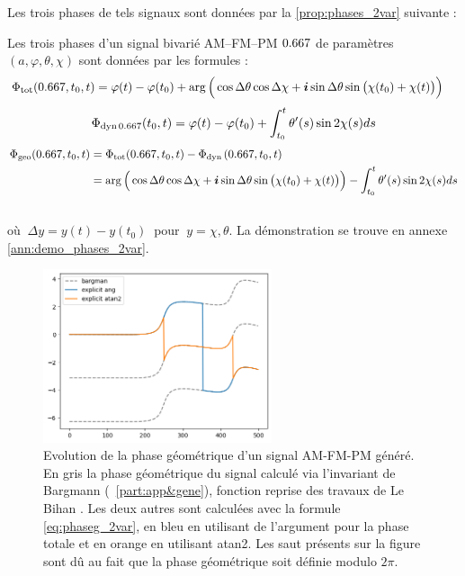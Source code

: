 Les trois phases de tels signaux sont données par la \cref{prop:phases_2var} suivante :
\begin{proposition}\label{prop:phases_2var}
	Les trois phases d'un signal bivarié AM--FM--PM $\x$ 	de paramètres $(a,\varphi,\theta,\chi)$ sont données par les formules :
	\begin{equation}\label{eq:phaset_2var}
		\begin{aligned}
			\phaset(\x,t_0,t) &= \varphi(t)-\varphi(t_0) + \arg\Big(\cos\Delta\theta \cos\Delta\chi + \i\sin\Delta\theta \sin\big(\chi(t_0)+\chi(t)\big)\Big)
		\end{aligned}
	\end{equation}
	\begin{equation}\label{eq:phased_2var}
		\phased[\x](t_0,t) = \varphi(t) -\varphi(t_0) + \int_{t_0}^t\theta'(s) \sin2\chi(s) ds
	\end{equation}
	\begin{equation}\label{eq:phaseg_2var}
		\begin{aligned}
			\phaseg(\x,t_0,t) &= \phaset(\x,t_0,t) - \phased(\x,t_0,t) \\
			&= \arg\Big(\cos\Delta\theta \cos\Delta\chi + \i\sin\Delta\theta \sin\big(\chi(t_0)+\chi(t)\big)\Big) - \int_{t_0}^t\theta'(s) \sin2\chi(s) ds
		\end{aligned}
	\end{equation}
	\\
	où $\ \Delta y = y(t) - y(t_0)\ $ pour $\ y = \chi, \theta$. La démonstration se trouve en annexe \ref{ann:demo_phases_2var}.
\end{proposition}
\skipl

\begin{figure}[h]
	\includegraphics[width = 0.6\textwidth]{fig/premier_resultat}
	\caption[Evolution de la phase géométrique d'un signal AM-FM-PM]{Evolution de la phase géométrique d'un signal AM-FM-PM généré. En gris la phase géométrique du signal calculé via l'invariant de Bargmann (\cf~\cref{part:app&gene}), fonction reprise des travaux de Le Bihan \etal \cite{le_bihan_modephysiques_2023,le_bihan_geometric_2024}. Les deux autres sont calculées avec la formule \cref{eq:phaseg_2var}, en bleu en utilisant de l'argument pour la phase totale et en orange en utilisant atan2. Les saut présents sur la figure sont dû au fait que la phase géométrique soit définie modulo $2\pi$.}
\end{figure}

